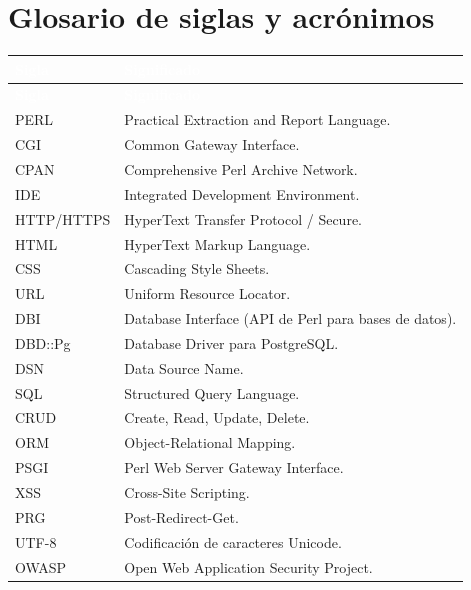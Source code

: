 \documentclass[11pt]{article}
\begin{document}
\section{Glosario de siglas y acrónimos}
{\renewcommand{\arraystretch}{1.25}
\begin{longtable}{>{\raggedright\arraybackslash}p{3cm} >{\raggedright\arraybackslash}p{12.4cm}}
\rowcolor{uteqverde}\textcolor{white}{\textbf{Sigla}} & \textcolor{white}{\textbf{Significado}} \\
\endfirsthead
\rowcolor{uteqverde}\textcolor{white}{\textbf{Sigla}} & \textcolor{white}{\textbf{Significado}} \\
\endhead
\ttfamily\color{uteqverde}PERL & Practical Extraction and Report Language. \\ \hline
\ttfamily\color{uteqverde}CGI & Common Gateway Interface. \\ \hline
\ttfamily\color{uteqverde}CPAN & Comprehensive Perl Archive Network. \\ \hline
\ttfamily\color{uteqverde}IDE & Integrated Development Environment. \\ \hline
\ttfamily\color{uteqverde}HTTP/HTTPS & HyperText Transfer Protocol / Secure. \\ \hline
\ttfamily\color{uteqverde}HTML & HyperText Markup Language. \\ \hline
\ttfamily\color{uteqverde}CSS & Cascading Style Sheets. \\ \hline
\ttfamily\color{uteqverde}URL & Uniform Resource Locator. \\ \hline
\ttfamily\color{uteqverde}DBI & Database Interface (API de Perl para bases de datos). \\ \hline
\ttfamily\color{uteqverde}DBD::Pg & Database Driver para PostgreSQL. \\ \hline
\ttfamily\color{uteqverde}DSN & Data Source Name. \\ \hline
\ttfamily\color{uteqverde}SQL & Structured Query Language. \\ \hline
\ttfamily\color{uteqverde}CRUD & Create, Read, Update, Delete. \\ \hline
\ttfamily\color{uteqverde}ORM & Object-Relational Mapping. \\ \hline
\ttfamily\color{uteqverde}PSGI & Perl Web Server Gateway Interface. \\ \hline
\ttfamily\color{uteqverde}XSS & Cross-Site Scripting. \\ \hline
\ttfamily\color{uteqverde}PRG & Post-Redirect-Get. \\ \hline
\ttfamily\color{uteqverde}UTF-8 & Codificación de caracteres Unicode. \\ \hline
\ttfamily\color{uteqverde}OWASP & Open Web Application Security Project. \\ \hline
\end{longtable}}
\end{document}
